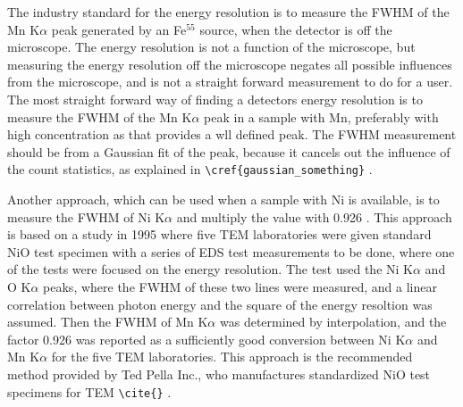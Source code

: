 


The industry standard for the energy resolution is to measure the FWHM of the Mn K$\alpha$ peak generated by an Fe$^55$ source, when the detector is off the microscope.
The energy resolution is not a function of the microscope, but measuring the energy resolution off the microscope negates all possible influences from the microscope, and is not a straight forward measurement to do for a user.
The most straight forward way of finding a detectors energy resolution is to measure the FWHM of the Mn K$\alpha$ peak in a sample with Mn, preferably with high concentration as that provides a wll defined peak.
The FWHM measurement should be from a Gaussian fit of the peak, because it cancels out the influence of the count statistics, as explained in \verb|\cref{gaussian_something}| .


Another approach, which can be used when a sample with Ni is available, is to measure the FWHM of Ni K$\alpha$ and multiply the value with 0.926 \cite{bennett_egerton_1995}.
This approach is based on a study in 1995 where five TEM laboratories were given  standard NiO test specimen with a series of EDS test measurements to be done, where one of the tests were focused on the energy resolution.
The test used the Ni K$\alpha$ and O K$\alpha$ peaks, where the FWHM of these two lines were measured, and a linear correlation between photon energy and the square of the energy resoltion was assumed.
Then the FWHM of Mn K$\alpha$ was determined by interpolation, and the factor 0.926 was reported as a sufficiently good conversion between Ni K$\alpha$ and Mn K$\alpha$ for the five TEM laboratories.
This approach is the recommended method provided by Ted Pella Inc., who manufactures standardized NiO test specimens for TEM \verb|\cite{}| .


